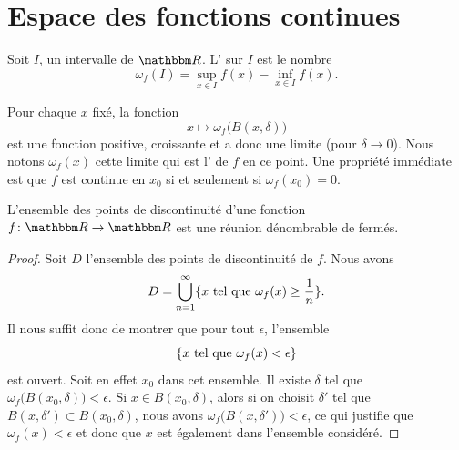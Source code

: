 
\section{Espace des fonctions continues}

\begin{definition}
    Soit \( I\), un intervalle de \( \eR\). L' sur \( I\) est le nombre
    \begin{equation}
        \omega_f(I)=\sup_{x\in I}f(x)-\inf_{x\in I}f(x).
    \end{equation}
\end{definition}
    Pour chaque \( x\) fixé, la fonction
    \begin{equation}
        x\mapsto \omega_f\big( B(x,\delta) \big)
    \end{equation}
    est une fonction positive, croissante et a donc une limite (pour \( \delta\to 0\)). Nous notons \( \omega_f(x)\) cette limite qui est l' de \( f\) en ce point. Une propriété immédiate est que \( f\) est continue en \( x_0\) si et seulement si \( \omega_f(x_0)=0\).

    \begin{lemma}       \label{LemuaPbtQ}
    L'ensemble des points de discontinuité d'une fonction \( f\colon \eR\to \eR\) est une réunion dénombrable de fermés.
\end{lemma}

\begin{proof}
    Soit \( D\) l'ensemble des points de discontinuité de \( f\). Nous avons
    \begin{equation}
        D=\bigcup_{n=1}^{\infty}\{ x\text{ tel que } \omega_f(x)\geq \frac{1}{ n } \}.
    \end{equation}
    Il nous suffit donc de montrer que pour tout \( \epsilon\), l'ensemble
    \begin{equation}
        \{ x\text{ tel que } \omega_f(x)<\epsilon \}
    \end{equation}
    est ouvert. Soit en effet \( x_0\) dans cet ensemble. Il existe \( \delta\) tel que \( \omega_f\big( B(x_0,\delta) \big)<\epsilon\). Si \( x\in B(x_0,\delta)\), alors si on choisit \( \delta'\) tel que \( B(x,\delta')\subset B(x_0,\delta)\), nous avons \( \omega_f\big( B(x,\delta') \big)<\epsilon\), ce qui justifie que \( \omega_f(x)<\epsilon\) et donc que \( x\) est également dans l'ensemble considéré.
\end{proof}

